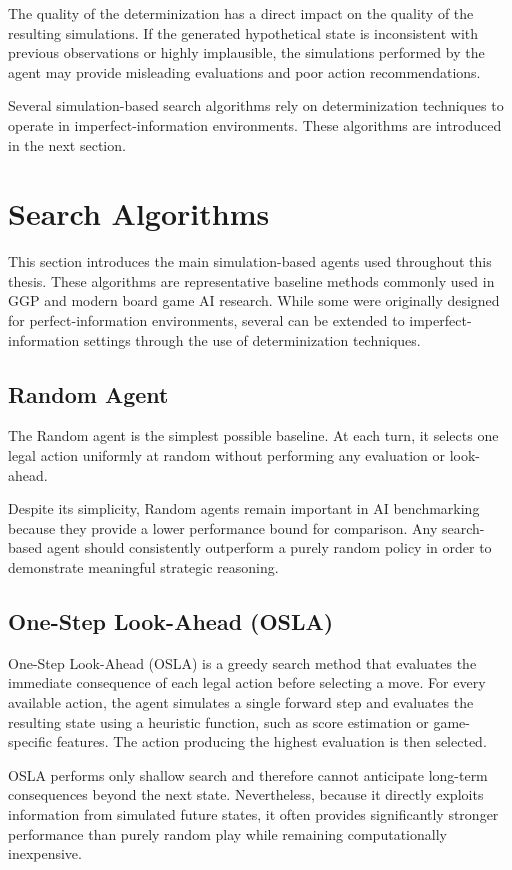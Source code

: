 The quality of the determinization has a direct impact on the quality of the resulting simulations. If the generated hypothetical state is inconsistent with previous observations or highly implausible, the simulations performed by the agent may provide misleading evaluations and poor action recommendations.

Several simulation-based search algorithms rely on determinization techniques to operate in imperfect-information environments. These algorithms are introduced in the next section.

\section{Search Algorithms}
This section introduces the main simulation-based agents used throughout this thesis. These algorithms are representative baseline methods commonly used in GGP and modern board game AI research. While some were originally designed for perfect-information environments, several can be extended to imperfect-information settings through the use of determinization techniques.

\subsection{Random Agent}
The Random agent is the simplest possible baseline. At each turn, it selects one legal action uniformly at random without performing any evaluation or look-ahead.

Despite its simplicity, Random agents remain important in AI benchmarking because they provide a lower performance bound for comparison. Any search-based agent should consistently outperform a purely random policy in order to demonstrate meaningful strategic reasoning.

\subsection{One-Step Look-Ahead (OSLA)}
One-Step Look-Ahead (OSLA)\cite{gaina2020tag} is a greedy search method that evaluates the immediate consequence of each legal action before selecting a move. For every available action, the agent simulates a single forward step and evaluates the resulting state using a heuristic function, such as score estimation or game-specific features. The action producing the highest evaluation is then selected.

OSLA performs only shallow search and therefore cannot anticipate long-term consequences beyond the next state. Nevertheless, because it directly exploits information from simulated future states, it often provides significantly stronger performance than purely random play while remaining computationally inexpensive.

